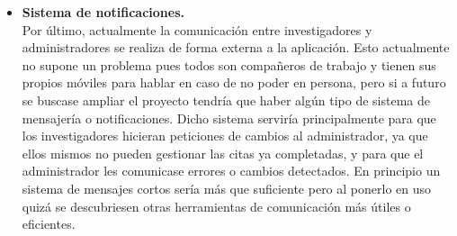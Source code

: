 \begin{itemize}
  \item\textbf{Sistema de notificaciones.} \\
  Por último, actualmente la comunicación entre investigadores y administradores se realiza de forma externa a la aplicación. Esto actualmente no supone un problema pues todos son compañeros de trabajo y tienen sus propios móviles para hablar en caso de no poder en persona, pero si a futuro se buscase ampliar el proyecto tendría que haber algún tipo de sistema de mensajería o notificaciones. Dicho sistema serviría principalmente para que los investigadores hicieran peticiones de cambios al administrador, ya que ellos mismos no pueden gestionar las citas ya completadas, y para que el administrador les comunicase errores o cambios detectados. En principio un sistema de mensajes cortos sería más que suficiente pero al ponerlo en uso quizá se descubriesen otras herramientas de comunicación más útiles o eficientes.
  \newline

  

\end{itemize}